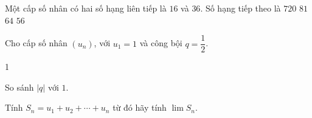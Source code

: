 \begin{ex}%
	Một cấp số nhân có hai số hạng liên  tiếp là $16$ và $36$. Số hạng tiếp theo là
	\choice 
		{$720$} 
		{\True  $81$}
		 {$64$}
		 {$56$}
\end{ex}

\begin{bt}%

	Cho cấp số nhân $(u_n)$, với $u_1=1$ và công bội $q=\dfrac{1}{2}$.
	\begin{enumEX}{1}
		\item So sánh $\left|q\right|$ với $1$.
		\item Tính $S_n=u_1+u_2+\cdots+u_n$ từ đó hãy tính $\lim S_n$.
	\end{enumEX}
\end{bt}
